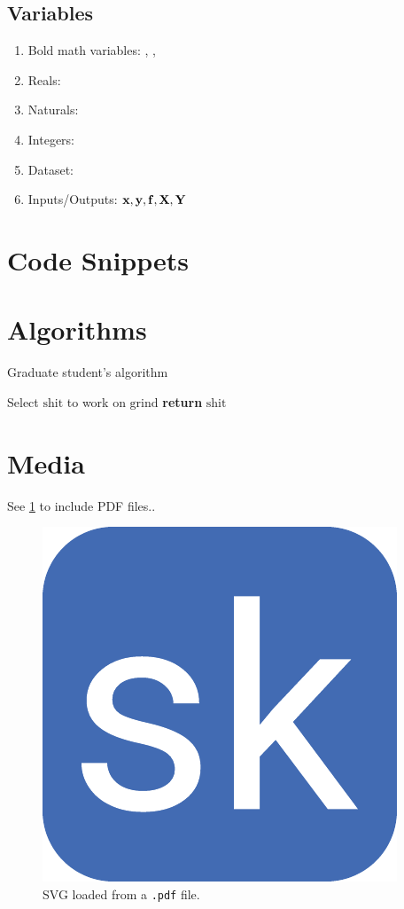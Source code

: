 \documentclass{article}
\begin{document}
\subsection{Variables}
\begin{enumerate}%
\item Bold math variables: \mbf{\Sigma}, ,
\item Reals: \reals
\item Naturals: \naturals
\item Integers: \ints
\item Dataset: \dset
\item Inputs/Outputs: ${\boldsymbol{\mathbf{x}}},{\boldsymbol{\mathbf{y}}},{\boldsymbol{\mathbf{f}}},{\boldsymbol{\mathbf{X}}},{\boldsymbol{\mathbf{Y}}}$
\end{enumerate}

\section{Code Snippets}



\section{Algorithms}

\begin{algorithm}
\caption{Graduate student’s algorithm}\label{euclid}
\begin{algorithmic}[1]
   \State Select $\mathrm{shit}$ to work on
      \State $\mathrm{grind}$
   \EndWhile
   \State \textbf{return} $\mathrm{shit}$
\EndProcedure
\end{algorithmic}
\end{algorithm}

\section{Media}

See \cref{fig:svg_pdf} to include PDF files..

\begin{figure}[ht]
    \centering
	\includegraphics[width=0.15\linewidth]{favicon.pdf} 
    \caption{SVG loaded from a \texttt{.pdf} file.}
    \label{fig:svg_pdf}
\end{figure}    
\end{document}
